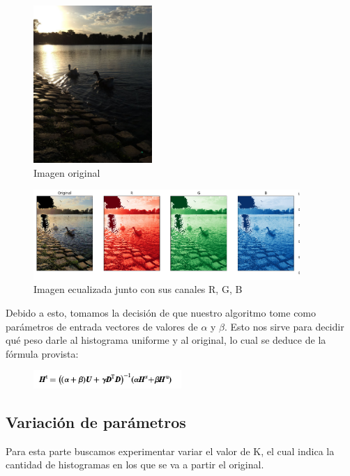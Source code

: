 \documentclass[10pt, a4paper]{article}
\begin{document}
\begin{figure}[H]
	\centering
        \includegraphics[width=0.4\textwidth]{patitos1.jpg}
        \caption{Imagen original}
\end{figure}
\begin{figure}[H]
	\centering
        \includegraphics[width=0.9\textwidth]{patitos-alpha096-beta004-k3.png}
        \caption{Imagen ecualizada junto con sus canales R, G, B}
\end{figure}

Debido a esto, tomamos la decisión de que nuestro algoritmo tome como parámetros de entrada vectores de valores de $\alpha$ y $\beta$. Esto nos sirve para decidir qué peso darle al histograma uniforme y al original, lo cual se deduce de la fórmula provista:

\begin{figure}[H]
	\centering
        \includegraphics[width=0.5\textwidth]{calculo-H.png}
\end{figure}

\subsection{Variación de parámetros}

Para esta parte buscamos experimentar variar el valor de K, el cual indica la cantidad de histogramas en los que se va a partir el original. 
\end{document}

